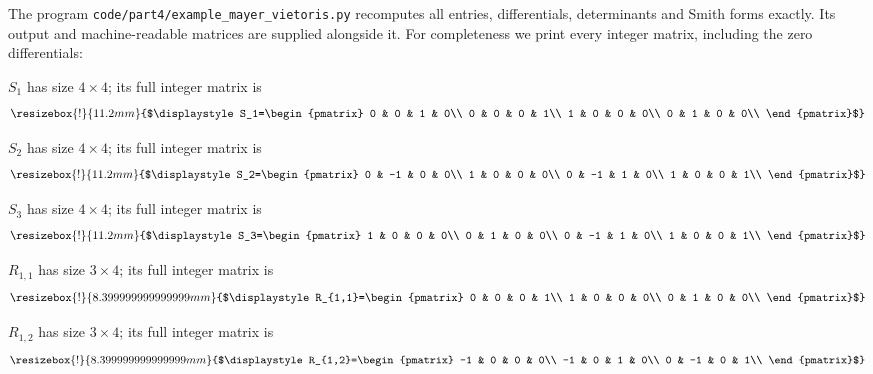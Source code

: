 The program \texttt{code/part4/example\_mayer\_vietoris.py} recomputes all
entries, differentials, determinants and Smith forms exactly. Its output
and machine-readable matrices are supplied alongside it. For completeness
we print every integer matrix, including the zero differentials:
\begingroup
\setlength{\arraycolsep}{1.7pt}
\renewcommand{\arraystretch}{0.88}
\par\smallskip\noindent
$S_1$ has size $4\times 4$; its full integer matrix is
\[
\resizebox{!}{11.2mm}{$\displaystyle S_1=\begin{pmatrix}
0 & 0 & 1 & 0\\
0 & 0 & 0 & 1\\
1 & 0 & 0 & 0\\
0 & 1 & 0 & 0\\
\end{pmatrix}$}
\]
\par\smallskip\noindent
$S_2$ has size $4\times 4$; its full integer matrix is
\[
\resizebox{!}{11.2mm}{$\displaystyle S_2=\begin{pmatrix}
0 & -1 & 0 & 0\\
1 & 0 & 0 & 0\\
0 & -1 & 1 & 0\\
1 & 0 & 0 & 1\\
\end{pmatrix}$}
\]
\par\smallskip\noindent
$S_3$ has size $4\times 4$; its full integer matrix is
\[
\resizebox{!}{11.2mm}{$\displaystyle S_3=\begin{pmatrix}
1 & 0 & 0 & 0\\
0 & 1 & 0 & 0\\
0 & -1 & 1 & 0\\
1 & 0 & 0 & 1\\
\end{pmatrix}$}
\]
\par\smallskip\noindent
$R_{1,1}$ has size $3\times 4$; its full integer matrix is
\[
\resizebox{!}{8.399999999999999mm}{$\displaystyle R_{1,1}=\begin{pmatrix}
0 & 0 & 0 & 1\\
1 & 0 & 0 & 0\\
0 & 1 & 0 & 0\\
\end{pmatrix}$}
\]
\par\smallskip\noindent
$R_{1,2}$ has size $3\times 4$; its full integer matrix is
\[
\resizebox{!}{8.399999999999999mm}{$\displaystyle R_{1,2}=\begin{pmatrix}
-1 & 0 & 0 & 0\\
-1 & 0 & 1 & 0\\
0 & -1 & 0 & 1\\
\end{pmatrix}$}
\]
